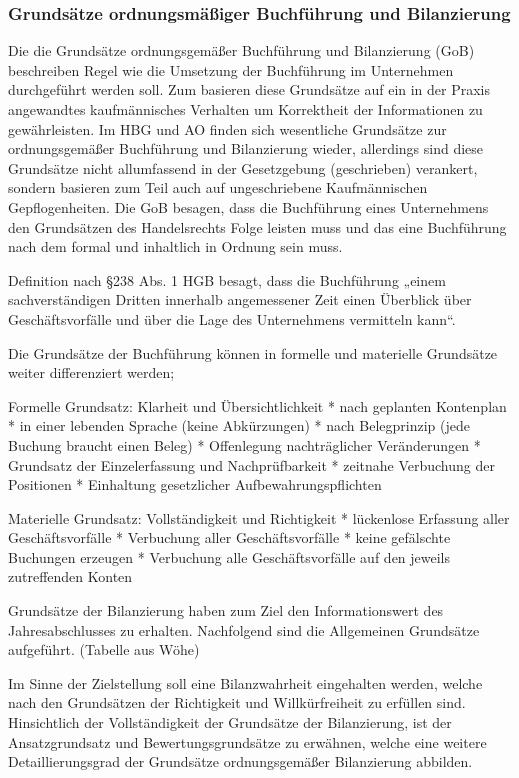 \subsubsection{Grundsätze ordnungsmäßiger Buchführung und Bilanzierung}
Die die Grundsätze ordnungsgemäßer Buchführung und Bilanzierung (GoB) beschreiben Regel wie die Umsetzung der Buchführung im Unternehmen durchgeführt werden soll. Zum basieren diese Grundsätze auf  ein in der Praxis angewandtes kaufmännisches Verhalten um Korrektheit der Informationen zu gewährleisten. Im HBG und AO finden sich wesentliche Grundsätze zur ordnungsgemäßer Buchführung und Bilanzierung wieder, allerdings sind diese Grundsätze nicht allumfassend in der Gesetzgebung (geschrieben) verankert, sondern basieren zum Teil auch auf ungeschriebene Kaufmännischen Gepflogenheiten. Die GoB besagen, dass die Buchführung eines Unternehmens den Grundsätzen des Handelsrechts Folge leisten muss und das eine Buchführung nach dem formal und inhaltlich in Ordnung sein muss. 

Definition nach §238 Abs. 1 HGB besagt, dass die Buchführung „einem sachverständigen Dritten innerhalb angemessener Zeit einen Überblick über Geschäftsvorfälle und über die Lage des Unternehmens vermitteln kann“.

Die Grundsätze der Buchführung können in formelle und materielle Grundsätze weiter differenziert werden;

Formelle Grundsatz: Klarheit und Übersichtlichkeit 
* nach geplanten Kontenplan
* in einer lebenden Sprache (keine Abkürzungen)
* nach Belegprinzip (jede Buchung braucht einen Beleg)
* Offenlegung nachträglicher Veränderungen
* Grundsatz der Einzelerfassung und Nachprüfbarkeit
* zeitnahe Verbuchung der Positionen
* Einhaltung gesetzlicher Aufbewahrungspflichten

Materielle Grundsatz: Vollständigkeit und Richtigkeit
* lückenlose Erfassung aller Geschäftsvorfälle
* Verbuchung aller Geschäftsvorfälle
* keine gefälschte Buchungen erzeugen
* Verbuchung alle Geschäftsvorfälle auf den jeweils zutreffenden Konten

Grundsätze der Bilanzierung haben zum Ziel den Informationswert des Jahresabschlusses zu erhalten. Nachfolgend sind die Allgemeinen Grundsätze aufgeführt. (Tabelle aus Wöhe)

Im Sinne der Zielstellung soll eine Bilanzwahrheit eingehalten werden, welche nach den Grundsätzen der Richtigkeit und Willkürfreiheit zu erfüllen sind. Hinsichtlich der Vollständigkeit der Grundsätze der Bilanzierung, ist der Ansatzgrundsatz und Bewertungsgrundsätze zu erwähnen, welche eine weitere Detaillierungsgrad der Grundsätze ordnungsgemäßer Bilanzierung abbilden.

